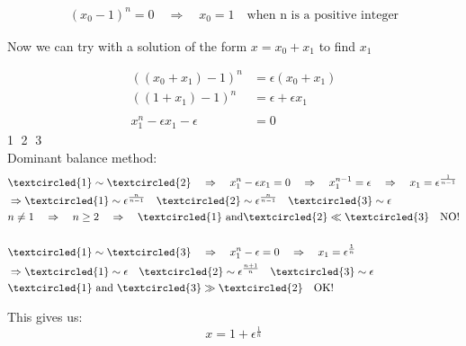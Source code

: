 \documentclass[english,a4paper,12pt]{article}
\begin{document}
\begin{align*}
(x_0 - 1)^n = 0 \quad \Rightarrow \quad x_0 = 1 \quad \text{when n is a positive integer}
\end{align*}

Now we can try with a solution of the form $x=x_0 + x_1$ to find $x_1$

\begin{align*}
((x_0 + x_1) - 1)^n &= \epsilon(x_0 + x_1)\\
((1 + x_1) - 1)^n &= \epsilon + \epsilon x_1\\\\
x_1^n - \epsilon x_1 - \epsilon &= 0
\end{align*}
\hspace{65mm}\textcircled{1} \hspace{3mm} \textcircled{2} \hspace{3mm} \textcircled{3}\\
Dominant balance method:\\

\begin{align*}
&\textcircled{1} \sim \textcircled{2} \quad \Rightarrow \quad x_1^n - \epsilon x_1 = 0 \quad \Rightarrow \quad x_1^{n-1} = \epsilon \quad \Rightarrow \quad x_1 = \epsilon^{\frac{1}{n-1}}\\
&\Rightarrow \textcircled{1} \sim \epsilon^{\frac{n}{n-1}} \quad \textcircled{2} \sim \epsilon^{\frac{n}{n-1}}  \quad  \textcircled{3} \sim \epsilon\\
&n \neq 1 \quad \Rightarrow \quad n \geq 2 \quad \Rightarrow \quad \textcircled{1} \text{ and} \textcircled{2} \ll \textcircled{3} \quad \text{NO!}\\\\
&\textcircled{1} \sim \textcircled{3} \quad \Rightarrow \quad x_1^n - \epsilon = 0 \quad \Rightarrow \quad x_1 = \epsilon^{\frac{1}{n}}\\
&\Rightarrow \textcircled{1} \sim \epsilon \quad \textcircled{2} \sim \epsilon^{\frac{n+1}{n}}  \quad  \textcircled{3} \sim \epsilon\\
&\textcircled{1} \text{ and } \textcircled{3} \gg \textcircled{2} \quad \text{OK!}
\end{align*}

This gives us:\\
$$x = 1 + \epsilon^{\frac{1}{n}}$$

\newpage 
\end{document}
